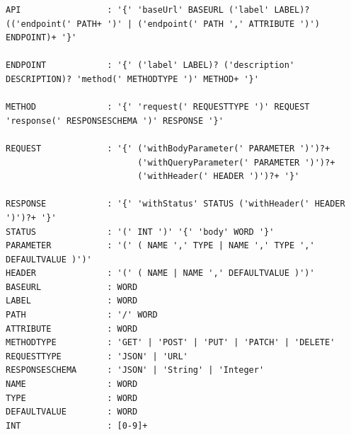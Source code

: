 \begin{lstlisting}
API                 : '{' 'baseUrl' BASEURL ('label' LABEL)? (('endpoint(' PATH+ ')' | ('endpoint(' PATH ',' ATTRIBUTE ')') ENDPOINT)+ '}'

ENDPOINT            : '{' ('label' LABEL)? ('description' DESCRIPTION)? 'method(' METHODTYPE ')' METHOD+ '}'

METHOD              : '{' 'request(' REQUESTTYPE ')' REQUEST 'response(' RESPONSESCHEMA ')' RESPONSE '}'

REQUEST             : '{' ('withBodyParameter(' PARAMETER ')')?+
                          ('withQueryParameter(' PARAMETER ')')?+
                          ('withHeader(' HEADER ')')?+ '}'

RESPONSE            : '{' 'withStatus' STATUS ('withHeader(' HEADER ')')?+ '}'
STATUS              : '(' INT ')' '{' 'body' WORD '}'
PARAMETER           : '(' ( ΝΑΜΕ ',' TYPE | NAME ',' TYPE ',' DEFAULTVALUE )')'
HEADER              : '(' ( ΝΑΜΕ | NAME ',' DEFAULTVALUE )')'
BASEURL             : WORD
LABEL               : WORD
PATH                : '/' WORD
ATTRIBUTE           : WORD
METHODTYPE          : 'GET' | 'POST' | 'PUT' | 'PATCH' | 'DELETE'
REQUESTTYPE         : 'JSON' | 'URL'
RESPONSESCHEMA      : 'JSON' | 'String' | 'Integer'
NAME                : WORD 
TYPE                : WORD
DEFAULTVALUE        : WORD
INT                 : [0-9]+  
\end{lstlisting}

